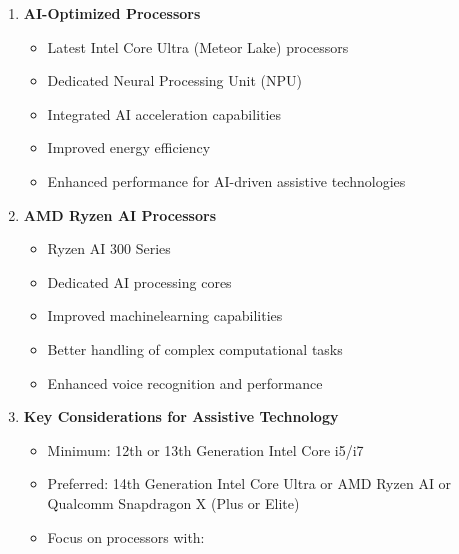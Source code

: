 \begin{enumerate}

	\item \textbf{AI-Optimized Processors}

	      \begin{itemize}
		      \item Latest Intel Core Ultra (Meteor Lake) processors \supercite{IntelMeteorLake}
		      \item Dedicated Neural Processing Unit (NPU) \supercite{IntelNPU}
		      \item Integrated \gls{AI} acceleration capabilities \supercite{IntelAIAcceleration}
		      \item Improved energy efficiency \supercite{IntelPowerEfficiency}
		      \item Enhanced performance for AI-driven assistive technologies \supercite{AIinAccessibility}
	      \end{itemize}

	\item \textbf{AMD Ryzen AI Processors}

	      \begin{itemize}
		      \item Ryzen AI 300 Series \supercite{AMDRyzenAI300}
		      \item Dedicated AI processing cores \supercite{AMDAIProcessing}
		      \item Improved \gls{machinelearning} capabilities \supercite{AMDMachineLearning}
		      \item Better handling of complex computational tasks \supercite{AMDRyzenPerformance}
		      \item Enhanced voice recognition and  performance \supercite{AIinAccessibility}
	      \end{itemize}

	\item \textbf{Key  Considerations for Assistive Technology}

	      \begin{itemize}
		      \item Minimum: 12th or 13th Generation Intel Core i5/i7 \supercite{IntelCoreRequirements}
		      \item Preferred: 14th Generation Intel Core Ultra or AMD Ryzen AI or Qualcomm Snapdragon X (Plus or Elite) \supercite{IntelMeteorLake, AMDRyzenAI, QualcommSnapdragonX}
		      \item Focus on processors with:


\end{itemize}
\end{enumerate}
